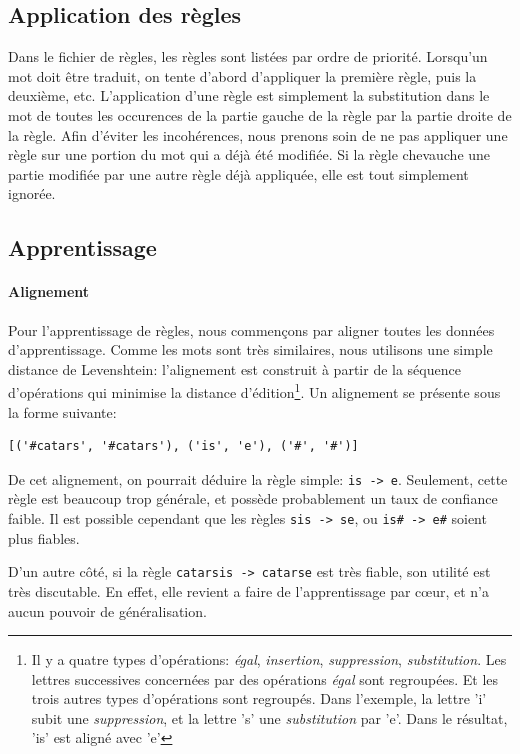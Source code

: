 \documentclass{article}
\begin{document}
\subsection{Application des règles}
Dans le fichier de règles, les règles sont listées par ordre de priorité. Lorsqu'un mot doit être traduit, on tente d'abord d'appliquer la première règle, puis la deuxième, etc.  L'application d'une règle est simplement la substitution dans le mot de toutes les occurences de la partie gauche de la règle par la partie droite de la règle. Afin d'éviter les incohérences, nous prenons soin de ne pas appliquer une règle sur une portion du mot qui a déjà été modifiée. Si la règle chevauche une partie modifiée par une autre règle déjà appliquée, elle est tout simplement ignorée.

\subsection{Apprentissage}
\paragraph{Alignement}
Pour l'apprentissage de règles, nous commençons par aligner toutes les données d'apprentissage. Comme les mots sont très similaires, nous utilisons une simple distance de Levenshtein: l'alignement est construit à partir de la séquence d'opérations qui minimise la distance d'édition\footnote{Il y a quatre types d'opérations: \emph{égal}, \emph{insertion}, \emph{suppression}, \emph{substitution}. Les lettres successives concernées par des opérations \emph{égal} sont regroupées. Et les trois autres types d'opérations sont regroupés. Dans l'exemple, la lettre 'i' subit une \emph{suppression}, et la lettre 's' une \emph{substitution} par 'e'. Dans le résultat, 'is' est aligné avec 'e'}.
Un alignement se présente sous la forme suivante:
\begin{verbatim}
[('#catars', '#catars'), ('is', 'e'), ('#', '#')]
\end{verbatim}

De cet alignement, on pourrait déduire la règle simple: \verb|is -> e|. Seulement, cette règle est beaucoup trop générale, et possède probablement un taux de confiance faible. Il est possible cependant que les règles \verb|sis -> se|, ou \verb|is# -> e#| soient plus fiables.

D'un autre côté, si la règle \verb|catarsis -> catarse| est très fiable, son utilité est très discutable. En effet, elle revient a faire de l'apprentissage par c\oe{}ur, et n'a aucun pouvoir de généralisation.
\end{document}
